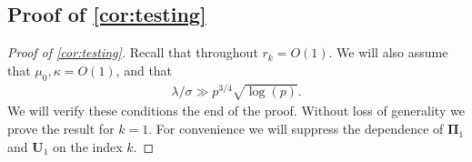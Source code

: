 \documentclass[10pt]{article}
\newcommand{\0}{{\mathbf{0}}}
\newcommand{\1}{{\mathbf{1}}}
\newcommand{\U}{{\mathbf{U}}}
\begin{document}
\subsection{Proof of \cref{cor:testing}} \label{sec:testingproof}
\begin{proof}[Proof of \cref{cor:testing}]
Recall that throughout $r_k = O(1)$.  We will also assume that $\mu_0,\kappa = O(1)$, and that \begin{align}
    \lambda/\sigma \gg p^{3/4} \sqrt{\log(p)}.\label{snrconditiontoverify} %
\end{align}
We will verify these conditions the end of the proof.  Without loss of generality we prove the result for $k = 1$.  For convenience we will suppress the dependence of $\mathbf{\Pi}_1$ and $\U_1$ on the index $k$.  


\end{proof}
\end{document}
